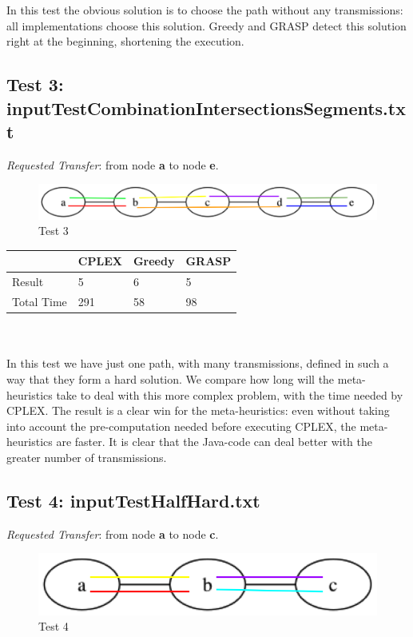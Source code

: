 \documentclass[11pt,a4paper]{article}
\begin{document}
In this test the obvious solution is to choose the path without any transmissions: all implementations choose this solution. Greedy and GRASP detect this solution right at the beginning, shortening the execution.

\subsection{Test 3: inputTestCombinationIntersectionsSegments.txt}

\textit{Requested Transfer}: from node \textbf{a} to node \textbf{e}.\\

\begin{figure}[H]
  \centering
    \includegraphics[scale=0.7]{inputTestCombinationIntersectionsSegments.png}
  \caption{Test 3}
  \label{fig:test3}
\end{figure}

\begin{tabular}{| l | l | l | l |}
\hline
 & CPLEX & Greedy & GRASP \\ \hline
Result & 5 & 6 & 5 \\ \hline
Total Time & 291 & 58 & 98 \\ \hline
\end{tabular}\\\\

In this test we have just one path, with many transmissions, defined in such a way that they form a hard solution. We compare how long will the meta-heuristics take to deal with this more complex problem, with the time needed by CPLEX. The result is a clear win for the meta-heuristics: even without taking into account the pre-computation needed before executing CPLEX, the meta-heuristics are faster. It is clear that the Java-code can deal better with the greater number of transmissions.

\subsection{Test 4: inputTestHalfHard.txt}

\textit{Requested Transfer}: from node \textbf{a} to node \textbf{c}.\\

\begin{figure}[H]
  \centering
    \includegraphics[scale=0.7]{inputTestHalfHard.png}
  \caption{Test 4}
  \label{fig:test4}
\end{figure}
\end{document}
